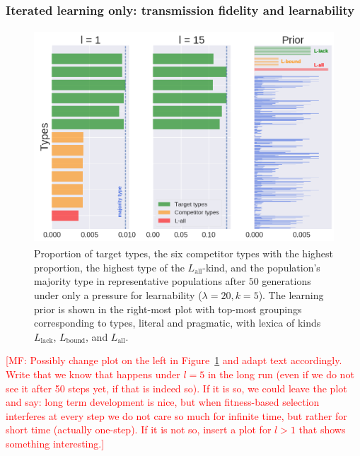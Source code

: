 \documentclass[a4paper, 11pt]{article}
\theoremstyle{Satz}
\newcommand{\mf}[1]{\textcolor{Red}{[MF: #1]}}
\newcommand{\mylang}[1]{\ensuremath{L_{\text{#1}}}\xspace} %
\newcommand{\Lall}{\mylang{all}}
\newcommand{\Lbound}{\mylang{bound}}
\newcommand{\Llack}{\mylang{lack}}
\begin{document}
\subsubsection{Iterated learning only: transmission fidelity and learnability}

\begin{figure}[t]
\centering
\includegraphics[width=1\textwidth,height=8cm,keepaspectratio]{./plots/barh-onlym}

\caption{Proportion of target types, the six competitor types with the highest proportion, the highest type of the $\Lall$-kind, and the population's majority type in representative populations after $50$ generations under only a
  pressure for learnability ($\lambda = 20, k = 5$). The learning prior is shown in the
  right-most plot with top-most groupings corresponding to types, literal and pragmatic, with
  lexica of kinds $\Llack$, $\Lbound$, and $\Lall$.}
\label{fig:only-M}
\end{figure}

\mf{Possibly change plot on the left in Figure~\ref{fig:only-M} and adapt text
  accordingly. Write that we know that happens under $l = 5$ in the long run (even if we do not
  see it after 50 steps yet, if that is indeed so). If it is so, we could leave the plot and
  say: long term development is nice, but when fitness-based selection interferes at every step
  we do not care so much for infinite time, but rather for short time (actually one-step). If
  it is not so, insert a plot for $l>1$ that shows something interesting.}
\end{document}
